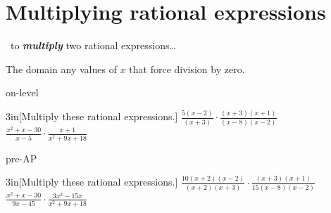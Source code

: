 \section{Multiplying rational expressions}

\begin{myConceptSteps}{~to {\bfseries\itshape multiply} two rational expressions\dots}
\end{myConceptSteps}

\begin{myCenteredBox}[width=4.25in,]
    The domain  any values of $x$ that force division by zero.
\end{myCenteredBox}

\begin{taggedblock}{on-level}
    \begin{my2Problems}{3in}[Multiply these rational expressions.]
        {
            $
            \frac
            {5(x-2)}
            {(x+3)}
            \cdot
            \frac
            {(x+3)(x+1)}
            {(x-8)(x-2)}
            $
        }
        {
            $
            \frac
            {x^2 + x - 30}
            {x - 5}
            \cdot
            \frac
            {x+1}
            {x^2 + 9x + 18}
            $
        }
    \end{my2Problems}
\end{taggedblock}
\begin{taggedblock}{pre-AP}
    \begin{my2Problems}{3in}[Multiply these rational expressions.]
        {
            $
            \frac
            {10(x+2)(x-2)}
            {(x+2)(x+3)}
            \cdot
            \frac
            {(x+3)(x+1)}
            {15(x-8)(x-2)}
            $
        }
        {
            $
            \frac
            {x^2 + x - 30}
            {9x - 45}
            \cdot
            \frac
            {3x^2 - 15x}
            {x^2 + 9x + 18}
            $
        }
    \end{my2Problems}
\end{taggedblock}

